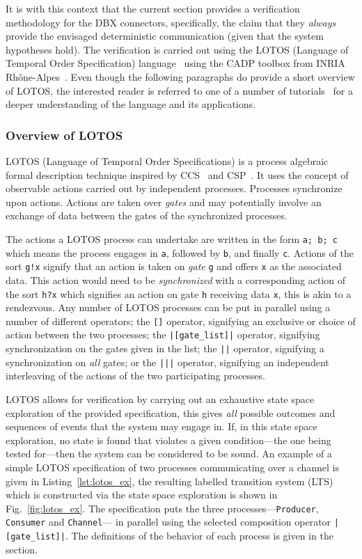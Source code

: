 It is with this context that the current section provides a
verification methodology for the DBX connectors, specifically, the
claim that they \emph{always} provide the envisaged deterministic
communication (given that the system hypotheses hold). The
verification is carried out using the LOTOS (Language of Temporal
Order Specification) language~\cite{bolognesi@cnis87} using the CADP
toolbox from INRIA Rh\^one-Alpes~\cite{garavel@cav07}. Even though the
following paragraphs do provide a short overview of LOTOS, the
interested reader is referred to one of a number of
tutorials~\cite{bolognesi@cnis87, logrippo@cnis92} for a deeper
understanding of the language and its applications.

\subsubsection{Overview of LOTOS}
LOTOS (Language of Temporal Order Specifications) is a process
algebraic formal description technique inspired by
CCS~\cite{milner-cc} and CSP~\cite{hoare@cacm78}. It uses the concept
of observable actions carried out by independent processes. Processes
synchronize upon actions. Actions are taken over \emph{gates} and may
potentially involve an exchange of data between the gates of the
synchronized processes.

The actions a LOTOS process can undertake are written in the form
\texttt{a; b; c} which means the process engages in \texttt{a},
followed by \texttt{b}, and finally \texttt{c}. Actions of the sort
\texttt{g!x} signify that an action is taken on \emph{gate} \texttt{g}
and offers \texttt{x} as the associated data. This action would need
to be \emph{synchronized} with a corresponding action of the sort
\texttt{h?x} which signifies an action on gate \texttt{h} receiving
data \texttt{x}, this is akin to a rendezvous. Any number of LOTOS
processes can be put in parallel using a number of different
operators; the \texttt{[]} operator, signifying an exclusive or choice
of action between the two processes; the \texttt{|[gate\_list]|}
operator, signifying synchronization on the gates given in the list;
the \texttt{||} operator, signifying a synchronization on \emph{all}
gates; or the \texttt{|||} operator, signifying an independent
interleaving of the actions of the two participating processes.

LOTOS allows for verification by carrying out an exhaustive state
space exploration of the provided specification, this gives \emph{all}
possible outcomes and sequences of events that the system may engage
in. If, in this state space exploration, no state is found that
violates a given condition---the one being tested for---then the
system can be considered to be sound. An example of a simple LOTOS
specification of two processes communicating over a channel is given
in Listing~\ref{lst:lotos_ex}, the resulting labelled transition
system (LTS) which is constructed via the state space exploration is
shown in Fig.~\ref{fig:lotos_ex}. The specification puts the three
processes---\texttt{Producer}, \texttt{Consumer} and
\texttt{Channel}--- in parallel using the selected composition
operator \texttt{|[gate\_list]|}. The definitions of the behavior of
each process is given in the  section.

